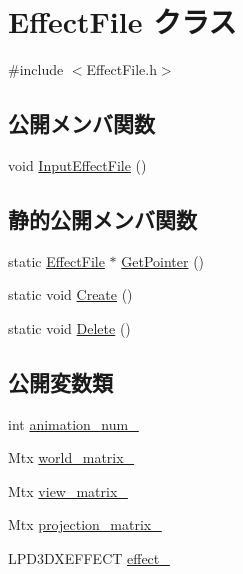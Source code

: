 \hypertarget{class_effect_file}{}\section{Effect\+File クラス}
\label{class_effect_file}


{\ttfamily \#include $<$Effect\+File.\+h$>$}

\subsection*{公開メンバ関数}
\begin{DoxyCompactItemize}
\item 
void \mbox{\hyperlink{class_effect_file_a8106530f6c71c81e7e2843cec9fe1094}{Input\+Effect\+File}} ()
\end{DoxyCompactItemize}
\subsection*{静的公開メンバ関数}
\begin{DoxyCompactItemize}
\item 
static \mbox{\hyperlink{class_effect_file}{Effect\+File}} $\ast$ \mbox{\hyperlink{class_effect_file_a0f61b1e53e67b28cb46f93b6ba20f941}{Get\+Pointer}} ()
\item 
static void \mbox{\hyperlink{class_effect_file_a637faf44d3465e7fe8a665d339680ba8}{Create}} ()
\item 
static void \mbox{\hyperlink{class_effect_file_a0d9799f2ea38fa594b59e43183d70ce0}{Delete}} ()
\end{DoxyCompactItemize}
\subsection*{公開変数類}
\begin{DoxyCompactItemize}
\item 
int \mbox{\hyperlink{class_effect_file_a991ad3cf78c2fcd2301f7f5e0d30b021}{animation\+\_\+num\+\_\+}}
\item 
Mtx \mbox{\hyperlink{class_effect_file_a95cfdd66e61e80e39238d5f889488a43}{world\+\_\+matrix\+\_\+}}
\item 
Mtx \mbox{\hyperlink{class_effect_file_a71209896998fbe94eb0ab4633784e126}{view\+\_\+matrix\+\_\+}}
\item 
Mtx \mbox{\hyperlink{class_effect_file_a3be0a571b431f3e317b53addeb8a284a}{projection\+\_\+matrix\+\_\+}}
\item 
L\+P\+D3\+D\+X\+E\+F\+F\+E\+CT \mbox{\hyperlink{class_effect_file_a77fb809b585787275652c7803cc472dc}{effect\+\_\+}}
\end{DoxyCompactItemize}
